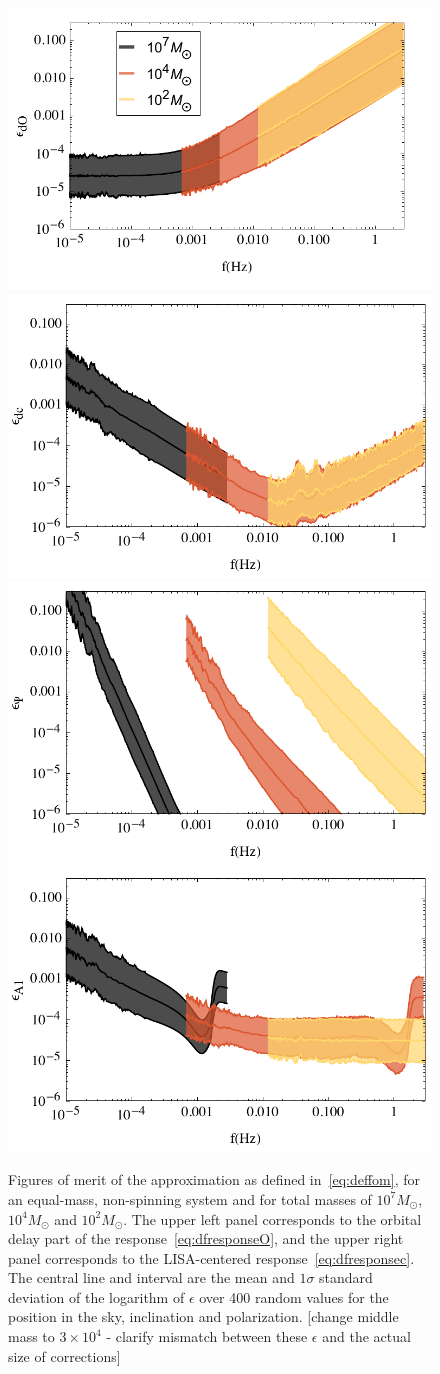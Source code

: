 \documentclass[aps,showpacs,%
prd,superscriptaddress,nofootinbib]{revtex4}
\newcommand{\Msol}{M_{\odot}}
\begin{document}
\begin{figure}
  \centering
  \includegraphics[width=.48\linewidth]{plots/LISAfomdO.pdf}
  \hspace{0.2cm}
  \includegraphics[width=.48\linewidth]{plots/LISAfomdc.pdf}
  \includegraphics[width=.48\linewidth]{plots/LISAfomPsi2.pdf}
  \hspace{0.2cm}
  \includegraphics[width=.48\linewidth]{plots/LISAfomA1.pdf}
  \caption{Figures of merit of the approximation as defined in~\eqref{eq:deffom}, for an equal-mass, non-spinning system and for total masses of $10^{7} \Msol$, $10^{4} \Msol$ and $10^{2} \Msol$. The upper left panel corresponds to the orbital delay part of the response~\eqref{eq:dfresponseO}, and the upper right panel corresponds to the LISA-centered response~\eqref{eq:dfresponsec}. The central line and interval are the mean and $1\sigma$ standard deviation of the logarithm of $\epsilon$ over 400 random values for the position in the sky, inclination and polarization. [change middle mass to $3\times 10^{4}$ - clarify mismatch between these $\epsilon$ and the actual size of corrections]}
  \label{fig:fomLISA}
\end{figure}
\end{document}
